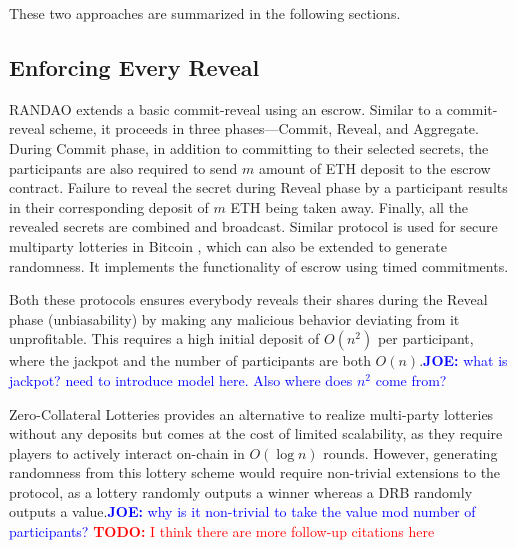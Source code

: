 \documentclass[letterpaper,twocolumn,10pt]{article}
\theoremstyle{definition}
\theoremstyle{remark}
\newcommand{\todo}[1]{\textcolor{red}{\textbf{TODO:} #1}}
\newcommand{\joenote}[1]{\textcolor{blue}{\textbf{JOE:} #1}}
\begin{document}
These two approaches are summarized in the following sections.


\subsection{Enforcing Every Reveal}
RANDAO \cite{youcai2017randao} extends a basic commit-reveal using an escrow. Similar to a commit-reveal scheme, it proceeds in three phases---Commit, Reveal, and Aggregate. During Commit phase, in addition to committing to their selected secrets, the participants are also required to send $m$ amount of ETH deposit to the escrow contract. Failure to reveal the secret during Reveal phase by a participant results in their corresponding deposit of $m$ ETH being taken away. Finally, all the revealed secrets are combined and broadcast. Similar protocol is used for secure multiparty lotteries in Bitcoin \cite{andrychowicz2014secure}, which can also be extended to generate randomness. It implements the functionality of escrow using timed commitments. 

Both these protocols ensures everybody reveals their shares during the Reveal phase (unbiasability) by making any malicious behavior deviating from it unprofitable. This requires a high initial deposit of $O(n^2)$ per participant, where the jackpot and the number of participants are both $O(n)$.\joenote{what is jackpot? need to introduce model here. Also where does $n^2$ come from?}

Zero-Collateral Lotteries \cite{miller2017zero} provides an alternative to realize multi-party lotteries without any deposits but comes at the cost of limited scalability, as they require players to actively interact on-chain in $O(\log n)$ rounds. However, generating randomness from this lottery scheme would require non-trivial extensions to the protocol, as a lottery randomly outputs a winner whereas a DRB randomly outputs a value.\joenote{why is it non-trivial to take the value mod number of participants?}
\todo{I think there are more follow-up citations here}
\end{document}
